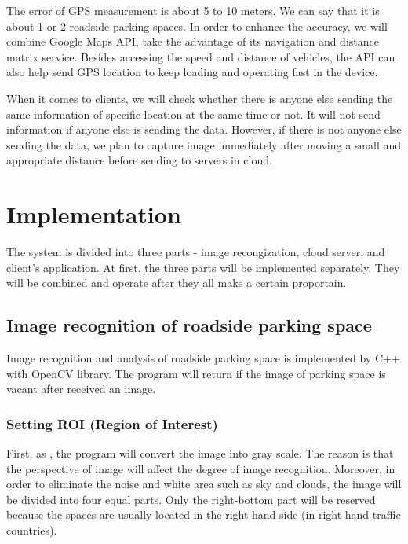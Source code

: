 \documentclass[journal,article,submit,moreauthors,pdftex,10pt,a4paper]{mdpi}
\begin{document}
The error of GPS measurement is about 5 to 10 meters. We can say
that it is about 1 or 2 roadside parking spaces. In order to enhance the
accuracy, we will combine Google Maps API, take the advantage of its
navigation and distance matrix service. Besides accessing the speed and
distance of vehicles, the API can also help send GPS location to keep
loading and operating fast in the device.

When it comes to clients, we will check whether there is anyone else
sending the same information of specific location at the same time or
not. It will not send information if anyone else is sending the data.
However, if there is not anyone else sending the data, we plan to
capture image immediately after moving a small and appropriate distance
before sending to servers in cloud.

\section{Implementation}\label{sec:implementation}

The system is divided into three parts - image recongization, cloud
server, and client's application. At first, the three parts will be implemented
separately. They will be combined and operate after they all make a certain proportain.

\subsection{Image recognition of roadside parking space}

Image recognition and analysis of roadside parking space is implemented by C++ with
OpenCV library. The program will return if the image of parking space is
vacant after received an image.

\subsubsection{Setting ROI (Region of Interest)}

First, as , the program will convert the image into gray scale. The reason is
that the perspective of image will affect the degree of image
recognition. Moreover, in order to eliminate the noise and white area such
as sky and clouds, the image will be divided into four equal parts.
Only the right-bottom part will be reserved because the spaces are
usually located in the right hand side (in right-hand-traffic countries).
\end{document}

